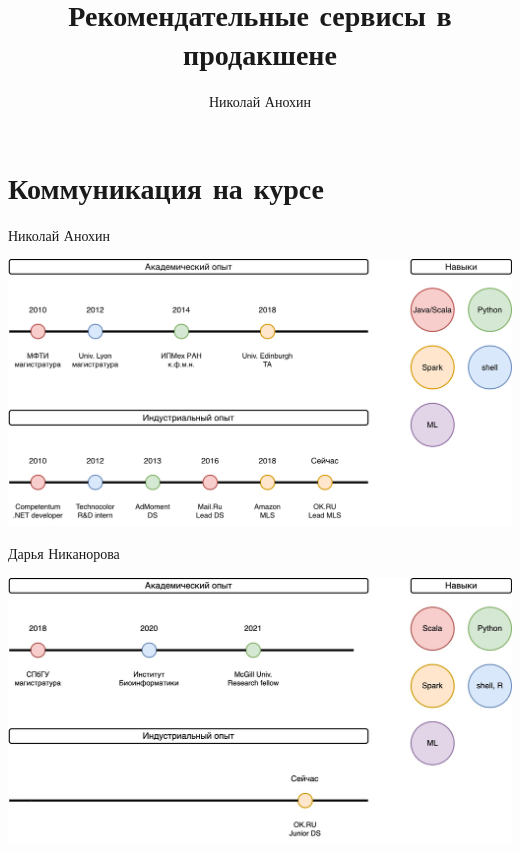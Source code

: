 \documentclass[11pt,aspectratio=169]{beamer}
\author{Николай Анохин}
\title{Рекомендательные сервисы в продакшене}
\begin{document}
{

\begin{frame}
\titlepage
\end{frame}


}

\section{Коммуникация на курсе}

\begin{frame}{Николай Анохин}

\begin{center}
\includegraphics[scale=0.23]{images/about-me.png}
\end{center}

\end{frame}

\begin{frame}{Дарья Никанорова}

\begin{center}
\includegraphics[scale=0.23]{images/about-me-dasha.jpg}
\end{center}

\end{frame}
\end{document}
